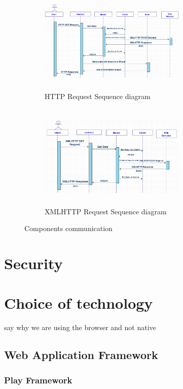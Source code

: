 \documentclass{l4proj}
\begin{document}
\begin{figure}[H]
	\begin{subfigure}{.5\textwidth}
		\centering
		\includegraphics[height=5cm,width=7cm]{images/HTTPRequestSequenceDiagram}
		\caption{HTTP Request Sequence diagram}
		\label{HTTPRequest}
	\end{subfigure}
	\begin{subfigure}{.5\textwidth}
		\centering
		\includegraphics[height=5cm,width=7cm]{images/XMLHTTPRequestSequenceDiagram}
		\caption{XMLHTTP Request Sequence diagram}
		\label{XMLHTTPRequest}
	\end{subfigure}
	\caption{Components communication}
\end{figure}

\clearpage

\section{Security}
  

\section{Choice of technology}

say why we are using the browser and not native
\subsection{Web Application Framework}

\subsubsection{Play Framework}
\end{document}
